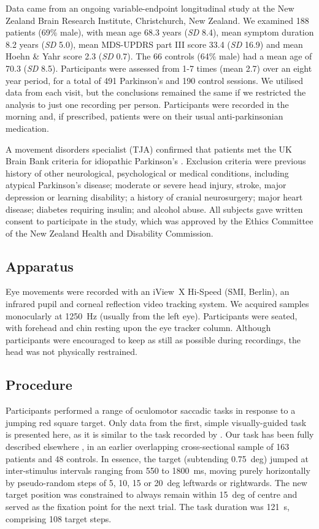 \documentclass[jou,a4paper]{apa6}
\begin{document}
Data came from an ongoing variable-endpoint longitudinal study at the New Zealand Brain Research Institute, Christchurch, New Zealand. We examined 188 patients (69\% male), with mean age 68.3 years (\textit{SD} 8.4), mean symptom duration 8.2 years (\textit{SD} 5.0), mean MDS-UPDRS part III score 33.4 (\textit{SD} 16.9) and mean Hoehn \& Yahr score 2.3 (\textit{SD} 0.7). The 66 controls (64\% male) had a mean age of 70.3 (\textit{SD} 8.5). Participants were assessed from 1-7 times (mean 2.7) over an eight year period, for a total of 491 Parkinson's and 190 control sessions. We utilised data from each visit, but the conclusions remained the same if we restricted the analysis to just one recording per person. Participants were recorded in the morning and, if prescribed, patients were on their usual anti-parkinsonian medication.

A movement disorders specialist (TJA) confirmed that patients met the UK Brain Bank criteria for idiopathic Parkinson's \citep{Hughes1992Accuracy-of-cli}. Exclusion criteria were previous history of other neurological, psychological or medical conditions, including atypical Parkinson's disease; moderate or severe head injury, stroke, major depression or learning disability; a history of cranial neurosurgery; major heart disease; diabetes requiring insulin; and alcohol abuse. All subjects gave written consent to participate in the study, which was approved by the Ethics Committee of the New Zealand Health and Disability Commission. 

\subsection{Apparatus}
Eye movements were recorded with an iView~X Hi-Speed (SMI, Berlin), an infrared pupil and corneal reflection video tracking system. We acquired samples monocularly at 1250~Hz (usually from the left eye). Participants were seated, with forehead and chin resting upon the eye tracker column. Although participants were encouraged to keep as still as possible during recordings, the head was not physically restrained.

\subsection{Procedure}
Participants performed a range of oculomotor saccadic tasks in response to a jumping red square target. Only data from the first, simple visually-guided task is presented here, as it is similar to the task recorded by \cite{Gitchel2012Pervasive-ocula}. Our task has been fully described elsewhere \citep{MacAskill2012The-influence-o}, in an earlier overlapping cross-sectional sample of 163 patients and 48 controls.
In essence, the target (subtending 0.75~deg) jumped at inter-stimulus intervals ranging from 550 to 1800~ms, moving purely horizontally by pseudo-random steps of 5, 10, 15 or 20~deg leftwards or rightwards. The new target position was constrained to always remain within 15~deg of centre and served as the fixation point for the next trial. The task duration was 121~s, comprising 108 target steps.
\end{document}
